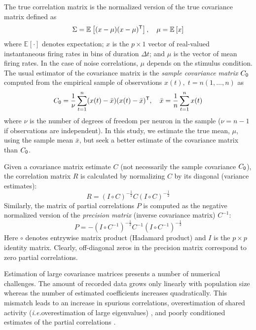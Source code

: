 \documentclass[10pt]{article}
\newcommand{\T}{{\sf T}}
\newcommand{\E}[2][]{\mathbb E_{#1}\left[ #2\right]}    %
\begin{document}
The true correlation matrix is the normalized version of the true covariance matrix defined as
\begin{equation}\label{eq:true-covariance}
    \Sigma = \E{(x-\mu)(x-\mu)^\T},\quad \mu = \E{x}
\end{equation}
where $\E{\cdot}$ denotes expectation; $x$ is the $p\times 1$ vector of real-valued instantaneous firing rates in bins of duration $\Delta t$; and $\mu$ is the vector of mean firing rates. In the case of noise correlations, $\mu$ depends on the stimulus condition.  The usual estimator of the covariance matrix is the \emph{sample covariance matrix} $C_{\sf 0}$ computed from the empirical sample of observations $x(t),\; t=n(1,\ldots,n)$ as
\begin{equation}
    C_{\sf 0} = \frac 1 \nu \sum\limits_{t=1}^n (x(t)-\bar x)(x(t)-\bar x)^\T,\quad \bar x= \frac 1 n \sum\limits_{t=1}^n x(t)
\end{equation}
where $\nu$ is the number of degrees of freedom per neuron in the sample ($\nu=n-1$ if observations are independent). In this study, we estimate the true mean, $\mu$,  using the sample mean $\bar x$, but seek a better estimate of the covariance matrix than $C_{\sf 0}$.

Given a covariance matrix estimate $C$ (not necessarily the sample covariance $C_{\sf 0}$), the correlation matrix $R$ is calculated by normalizing $C$ by its diagonal (variance estimates):
\begin{equation}
    R = \left(I\circ C\right)^{-\frac 1 2} C \left(I\circ C\right)^{-\frac 1 2}
\end{equation}
Similarly, the matrix of partial correlations $P$ is computed as the negative normalized version of the \emph{precision matrix} (inverse covariance matrix) $C^{-1}$:
\begin{equation}
    P = -\left(I\circ C^{-1}\right)^{-\frac 1 2} C^{-1} \left(I\circ C^{-1}\right)^{-\frac 1 2}
\end{equation}
Here $\circ$ denotes entrywise matrix product (Hadamard product) and $I$ is the $p\times p$ identity matrix. Clearly, off-diagonal zeros in the precision matrix correspond to zero partial correlations. 

Estimation of large covariance matrices presents a number of numerical challenges.  The amount of recorded data grows only linearly with population size whereas the number of estimated coefficients increases quadratically.  This mismatch leads to an increase in spurious correlations, overestimation of shared activity (\emph{i.e.}\;overestimation of large eigenvalues) \cite{Ledoit:2004}, and poorly conditioned estimates of the partial correlations \cite{Schafer:2005}.
\end{document}
